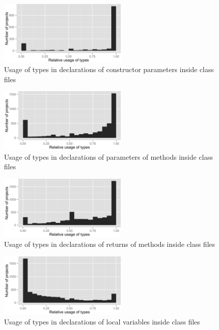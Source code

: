 \begin{figure}[h]
\centering 
\includegraphics[width=0.55\textwidth]{../aosd_2014/analysis/result/script/class/histograms/9_Constructor_Parameter.png} 
\caption{Usage of types in declarations of constructor parameters inside class files}
\end{figure}

\begin{figure}[h]
\centering 
\includegraphics[width=0.55\textwidth]{../aosd_2014/analysis/result/script/class/histograms/8_Method_Parameter.png} 
\caption{Usage of types in declarations of parameters of methods inside class files}
\end{figure}

\begin{figure}[h]
\centering 
\includegraphics[width=0.55\textwidth]{../aosd_2014/analysis/result/script/class/histograms/7_Method_Return.png} 
\caption{Usage of types in declarations of returns of methods inside class files}
\end{figure}

\begin{figure}[h]
\centering 
\includegraphics[width=0.55\textwidth]{../aosd_2014/analysis/result/script/class/histograms/6_Local_Variable.png} 
\caption{Usage of types in declarations of local variables inside class files}
\end{figure}

